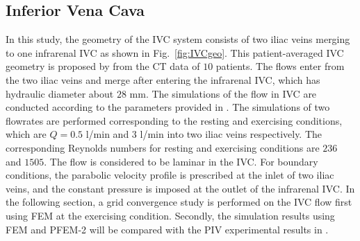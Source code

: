 \subsection{Inferior Vena Cava}

In this study, the geometry of the IVC system consists of two iliac veins merging to one infrarenal IVC as shown in Fig.~\ref{fig:IVCgeo}. This patient-averaged IVC geometry is proposed by \cite{gallagher_exp} from the CT data of $10$ patients. The flows enter from the two iliac veins and merge after entering the infrarenal IVC, which has hydraulic diameter about $28$ mm. 
The simulations of the flow in IVC are conducted according to the parameters provided in \cite{craven_cfd}. The simulations of two flowrates are performed corresponding to the resting and exercising conditions, which are $Q= 0.5$ l/min and $3$ l/min into two iliac veins respectively. The corresponding Reynolds numbers for resting and exercising conditions are $236$ and $1505$. The flow is considered to be laminar in the IVC. For boundary conditions, the parabolic velocity profile is prescribed at the inlet of two iliac veins, and the constant pressure is imposed at the outlet of the infrarenal IVC.
In the following section, a grid convergence study is performed on the IVC flow first using FEM at the exercising condition. Secondly, the simulation results using FEM and PFEM-2 will be compared with the PIV experimental results in \cite{gallagher_exp}. 

